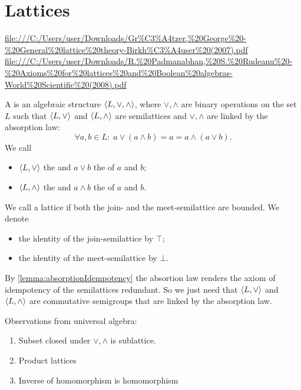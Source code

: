 \section{Lattices}
\url{file:///C:/Users/user/Downloads/Gr%C3%A4tzer,%20George%20-%20General%20lattice%20theory-Birkh%C3%A4user%20(2007).pdf}
\url{file:///C:/Users/user/Downloads/R.%20Padmanabhan,%20S.%20Rudeanu%20-%20Axioms%20for%20lattices%20and%20Boolean%20algebras-World%20Scientific%20(2008).pdf}
\begin{definition}
A  is an algebraic structure $\langle L,\vee, \wedge \rangle$, where $\vee, \wedge$ are binary operations on the set $L$ such that $\langle L,\vee \rangle$ and $\langle L,\wedge \rangle$ are semilattices and $\vee,\wedge$ are linked by the absorption law:
\[ \forall a,b\in L: \; a \vee (a \wedge b) = a = a \wedge (a\vee b). \]
We call
\begin{itemize}
\item $\langle L,\vee \rangle$ the  and $a\vee b$ the  of $a$ and $b$;
\item $\langle L,\wedge \rangle$ the  and $a\wedge b$ the  of $a$ and $b$.
\end{itemize}
We call a lattice  if both the join- and the meet-semilattice are bounded. We denote
\begin{itemize}
\item the identity of the join-semilattice by $\top$;
\item the identity of the meet-semilattice by $\bot$.
\end{itemize}
\end{definition}
By \ref{lemma:absorptionIdempotency} the absortion law renders the axiom of  idempotency of the semilattices redundant. So we just need that $\langle L,\vee \rangle$ and $\langle L,\wedge \rangle$ are commutative semigroups that are linked by the absorption law.

\begin{proposition}
Observations from universal algebra:
\begin{enumerate}
\item Subset closed under $\vee,\wedge$ is sublattice.
\item Product lattices
\item Inverse of homomorphism is homomorphism
\end{enumerate}
\end{proposition}


